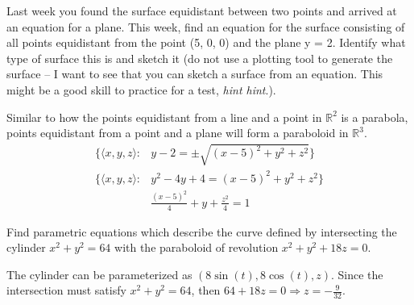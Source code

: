 \documentclass[12pt]{exam}
\begin{document}
\begin{questions}
\clearpage
\question Last week you found the surface equidistant between two points and 
	arrived at an equation for a plane. This week, find an equation for the 
	surface consisting of all points equidistant from the point (5, 0, 0) 
	and the plane y = 2. Identify what type of surface this is and sketch 
	it (do not use a plotting tool to generate the surface – I want to see 
	that you can sketch a surface from an equation. This might be a good
	skill to practice for a test, \textit{hint hint}.).
	\begin{solution}
		Similar to how the points equidistant from a line and a point in $\mathbb{R}^2$ is a parabola, points equidistant from a point and a plane will form a paraboloid in $\mathbb{R}^3$.
		\begin{align*}
			\{ \langle x,y,z \rangle : &y-2 = \pm \sqrt{(x - 5)^2 + y^2 + z^2} \} \\
			\{ \langle x,y,z \rangle : &y^2 - 4y + 4 = (x - 5)^2 + y^2 + z^2 \} \\
			&\boxed{\frac{(x - 5)^2}{4} + y + \frac{z^2}{4} = 1 } \tag*{\qed}
		\end{align*}
	\end{solution}
\clearpage
\question Find parametric equations which describe the curve defined 
	by intersecting the cylinder $x^2 + y^2 = 64$ with the paraboloid of 
	revolution $x^2 + y^2 + 18z = 0$.
	\begin{solution}
		The cylinder can be parameterized as $(8\sin(t), 8\cos(t), z)$. Since the intersection must satisfy $x^2 + y^2 = 64$, then $64 + 18z = 0 \Rightarrow z= -\frac{9}{32}$. \\

\end{solution}
\end{questions}
\end{document}
